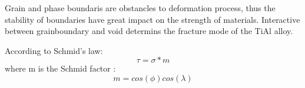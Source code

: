 \documentclass[materials,article,submit,moreauthors,pdftex,10pt,a4paper]{Definitions/mdpi}
\begin{document}
Grain and phase boundaris are obstancles to deformation process, thus the stability of boundaries have great impact on the strength of materials. Interactive between grainboundary and void determins the fracture mode of the TiAl alloy.
	
According to Schmid's law:
	$$\tau = \sigma*m$$
where m is the Schmid factor :
	$$ m = cos(\phi)cos(\lambda)$$


\end{document}
